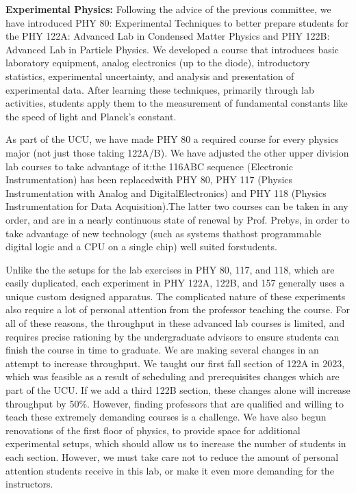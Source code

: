 \documentclass[12pt]{article}
\begin{document}
\noindent
{\bf Experimental Physics:} Following the advice of the previous
committee, we have introduced PHY 80: Experimental Techniques to better
prepare students for the PHY 122A: Advanced Lab in Condensed Matter
Physics and PHY 122B: Advanced Lab in Particle Physics.  We developed
a course that introduces basic laboratory equipment, analog
electronics (up to the diode), introductory statistics, experimental 
uncertainty, and analysis and presentation of experimental data.  After 
learning these techniques, primarily through lab activities, students
apply them to the measurement of fundamental constants like the speed 
of light and Planck's constant.  

As part of the UCU, we have made PHY 80 a required course for every physics major (not just those taking 122A/B).  We have adjusted the other upper division lab courses to take advantage of it:the 116ABC sequence (Electronic Instrumentation) has been replacedwith PHY 80, PHY 117 (Physics Instrumentation with Analog and DigitalElectronics) and PHY 118 (Physics Instrumentation for Data Acquisition).The latter two courses can be taken in any order, and are in a nearly continuous state of renewal by Prof. Prebys, in order to take advantage of new technology (such as systems thathost programmable digital logic and a CPU on a single chip) well suited forstudents.

Unlike the the setups for the lab exercises in PHY 80, 117, and 118, which are easily duplicated, each experiment in PHY 122A, 122B, and 157 generally uses a unique custom designed apparatus.  The complicated nature of these experiments also require a lot of personal attention from the professor teaching the course.  For all of these reasons, the throughput in these advanced lab courses is limited, and requires precise rationing by the undergraduate advisors to ensure students can finish the course in time to graduate.  We are making several changes in an attempt to increase throughput.  We taught our first fall section of 122A in 2023, which was feasible as a result of scheduling and prerequisites changes which are part of the UCU.  If we add a third 122B section, these changes alone will increase throughput by 50\%.  
However, finding professors that are qualified and willing to teach these extremely demanding courses is a challenge.  We have also begun renovations of the first floor of physics, to provide space for additional experimental setups, which should allow us to increase the number of students in each section.  However, we must take care not to reduce the amount of personal attention students receive in this lab, or make it even more demanding for the instructors.  
\end{document}
